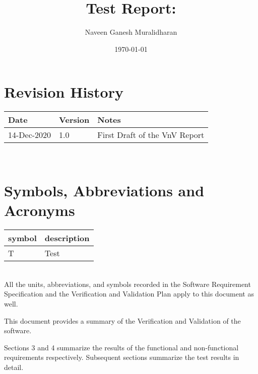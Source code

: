 \documentclass[12pt, titlepage]{article}
\begin{document}
\title{Test Report: \progname{}} 
\author{Naveen Ganesh Muralidharan}
\date{\today}
	
\maketitle


\section{Revision History}

\begin{tabularx}{\textwidth}{p{3cm}p{2cm}X}
\toprule {\bf Date} & {\bf Version} & {\bf Notes}\\
\midrule
14-Dec-2020 & 1.0 & First Draft of the VnV Report\\

\bottomrule
\end{tabularx}

~\newpage

\section{Symbols, Abbreviations and Acronyms}

\renewcommand{\arraystretch}{1.2}
\begin{tabular}{l l} 
  \toprule		
  \textbf{symbol} & \textbf{description}\\
  \midrule 
  T & Test\\
  \bottomrule
\end{tabular}\\

All the units, abbreviations, and symbols recorded in the Software Requirement 
Specification \cite{SRS} and the Verification and Validation Plan \cite{VnVPlan}  
apply to this document as well.


\newpage

\tableofcontents

\listoftables %

\newpage


This document provides a summary of the Verification and Validation of the 
\progname{} software. 

Sections 3 and 4 summarize the results of the functional and non-functional
requirements respectively. Subsequent sections summarize the test results
in detail.
\end{document}
